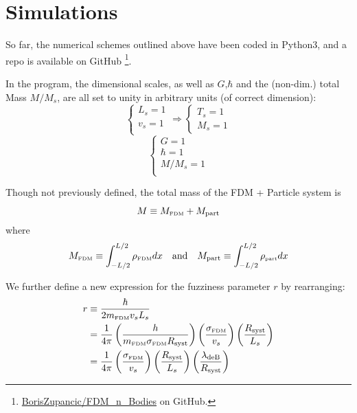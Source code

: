 \documentclass[oneside]{book}
\begin{document}
\chapter{Simulations}
So far, the numerical schemes outlined above have been coded in Python3, and a repo is available on GitHub \footnote{\hyperlink{https://github.com/BorisZupancic/FDM_n_Bodies}{BorisZupancic/FDM\_n\_Bodies} on GitHub.}.

In the program, the dimensional scales, as well as $G$,$\hbar$ and the (non-dim.) total Mass $M/M_s$, are all set to unity in arbitrary units (of correct dimension):
\begin{equation*}
    \begin{cases} L_s = 1\\ v_s = 1\\ \end{cases}\Rightarrow \begin{cases}T_s = 1\\ M_s = 1\end{cases} 
\end{equation*}
\begin{equation*}
    \begin{cases}
        G = 1\\
        \hbar = 1\\
        M / M_s = 1\\
    \end{cases}
\end{equation*}
    
Though not previously defined, the total mass of the FDM + Particle system is 
\begin{equation}
    M \equiv M_\text{\tiny{FDM}} + M_\text{part} \\
\end{equation}
where
\begin{align}
    M_\text{\tiny{FDM}} \equiv \int_{-L/2}^{L/2} \rho_\text{\tiny{FDM}} dx & &\text{and}& &
    M_\text{part} \equiv \int_{-L/2}^{L/2} \rho_\text{\tiny{part}} dx
\end{align}

We further define a new expression for the fuzziness parameter $r$ by rearranging:
\begin{align}
    r & \equiv \frac{\hbar}{2m_\text{\tiny{FDM}} v_s L_s}  \\
    & = \frac{1}{4\pi} \left(\frac{h}{m_\text{\tiny{FDM}} \sigma_\text{\tiny{FDM}} R_\text{syst}}\right) \left(\frac{\sigma_\text{\tiny{FDM}}}{v_s}\right) \left(\frac{R_\text{syst}}{L_s}\right) \\
    & = \frac{1}{4\pi} \left(\frac{\sigma_\text{\tiny{FDM}}}{v_s}\right) \left(\frac{R_\text{syst}}{L_s}\right)
    \left(\frac{\lambda_\text{deB}}{R_\text{syst}}\right)
\end{align}
\end{document}
